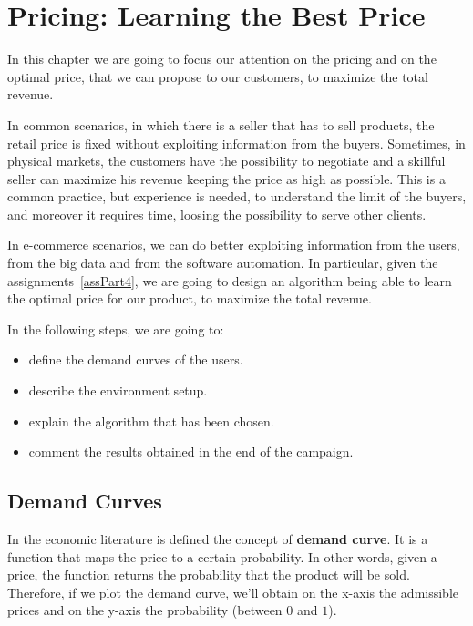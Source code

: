 \chapter{Pricing: Learning the Best Price}

In this chapter we are going to focus our attention on the pricing and on the optimal price, that we can propose to our customers, to maximize the total revenue.

In common scenarios, in which there is a seller that has to sell products, the retail price is fixed without exploiting information from the buyers.
Sometimes, in physical markets, the customers have the possibility to negotiate and a skillful seller can maximize his revenue keeping the price as high as possible. This is a common practice, but experience is needed, to understand the limit of the buyers, and moreover it requires time, loosing the possibility to serve other clients.

In e-commerce scenarios, we can do better exploiting information from the users, from the big data and from the software automation.
In particular, given the assignments~\ref{assPart4}, we are going to design an algorithm being able to learn the optimal price for our product, to maximize the total revenue.

In the following steps, we are going to:
\begin{itemize}
    \item define the demand curves of the users.
    \item describe the environment setup.
    \item explain the algorithm that has been chosen.
    \item comment the results obtained in the end of the campaign.
\end{itemize}


\section{Demand Curves}

In the economic literature is defined the concept of \textbf{demand curve}.
It is a function that maps the price to a certain probability. In other words, given a price, the function returns the probability that the product will be sold. Therefore, if we plot the demand curve, we'll obtain on the x-axis the admissible prices and on the y-axis the probability (between $0$ and $1$).

